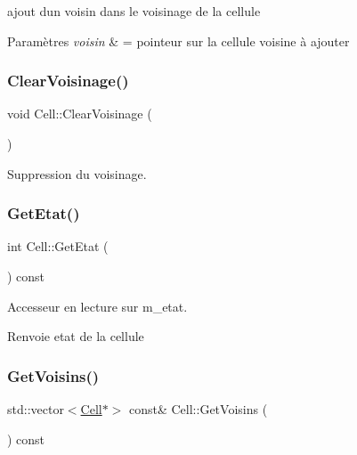 ajout d\textquotesingle{}un voisin dans le voisinage de la cellule 


\begin{DoxyParams}{Paramètres}
{\em voisin} & = pointeur sur la cellule voisine à ajouter \\
\hline
\end{DoxyParams}
\mbox{\label{class_cell_a4f07be87bb04bdc457726c51f2c69bcc}} 
\subsubsection{\texorpdfstring{Clear\+Voisinage()}{ClearVoisinage()}}
{\footnotesize\ttfamily void Cell\+::\+Clear\+Voisinage (\begin{DoxyParamCaption}{ }\end{DoxyParamCaption})\hspace{0.3cm}{\ttfamily [inline]}}



Suppression du voisinage. 

\mbox{\label{class_cell_a7640093c787979958fbb772e4fccdffa}} 
\subsubsection{\texorpdfstring{Get\+Etat()}{GetEtat()}}
{\footnotesize\ttfamily int Cell\+::\+Get\+Etat (\begin{DoxyParamCaption}{ }\end{DoxyParamCaption}) const\hspace{0.3cm}{\ttfamily [inline]}}



Accesseur en lecture sur m\+\_\+etat. 

\begin{DoxyReturn}{Renvoie}
etat de la cellule 
\end{DoxyReturn}
\mbox{\label{class_cell_a5c2a7b09dcb8afed0040ebdc4267408d}} 
\subsubsection{\texorpdfstring{Get\+Voisins()}{GetVoisins()}}
{\footnotesize\ttfamily std\+::vector$<$\mbox{\hyperlink{class_cell}{Cell}}$\ast$$>$ const\& Cell\+::\+Get\+Voisins (\begin{DoxyParamCaption}{ }\end{DoxyParamCaption}) const\hspace{0.3cm}{\ttfamily [inline]}}



